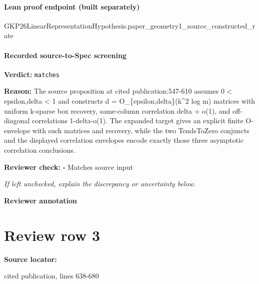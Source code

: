 \documentclass[10pt]{article}
\newcommand{\reviewerbox}{%
  \par\noindent\fbox{\parbox{0.96\linewidth}{\rule{0pt}{0.38in}}}\par
}
\newcommand{\reviewmatch}[1]{%
  \par\noindent\textbf{Reviewer check:} $\square$\; #1\par
  \noindent\emph{If left unchecked, explain the discrepancy or uncertainty below.}\par
}
\begin{document}
\paragraph{Lean proof endpoint (built separately)}\begin{ReviewVerbatim}
GKP26LinearRepresentationHypothesis.paper_geometry1_source_constructed_rate
\end{ReviewVerbatim}

\paragraph{Recorded source-to-Spec screening}
\textbf{Verdict:} \texttt{matches}
\\
{\raggedright
\textbf{Reason:} The source proposition at cited publication:\allowbreak{}547-\allowbreak{}610 assumes 0 < epsilon,delta < 1 and constructs d = O\_\allowbreak{}\{epsilon,delta\}(k\textasciicircum{}2 log m) matrices with uniform k-\allowbreak{}sparse box recovery, same-\allowbreak{}column correlation delta + o(1), and off-\allowbreak{}diagonal correlations 1-\allowbreak{}delta-\allowbreak{}o(1).\allowbreak{} The expanded target gives an explicit finite O-\allowbreak{}envelope with such matrices and recovery, while the two TendsToZero conjuncts and the displayed correlation envelopes encode exactly those three asymptotic correlation conclusions.\allowbreak{}
\par}
\reviewmatch{Matches source input}
\noindent\textbf{Reviewer annotation}\par
\reviewerbox
\clearpage
\hypertarget{source-claim-0d1630b3f82fa739}{}
\section*{Review row 3}
\textbf{Source locator:} {\footnotesize\raggedright cited publication, lines 638-\allowbreak{}680\par}
\end{document}

